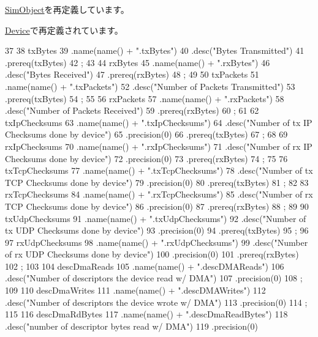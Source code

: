 \hyperlink{classSimObject_a4dc637449366fcdfc4e764cdf12d9b11}{SimObject}を再定義しています。

\hyperlink{classSinic_1_1Device_a4dc637449366fcdfc4e764cdf12d9b11}{Device}で再定義されています。


\begin{DoxyCode}
37 {
38     txBytes
39         .name(name() + ".txBytes")
40         .desc("Bytes Transmitted")
41         .prereq(txBytes)
42         ;
43 
44     rxBytes
45         .name(name() + ".rxBytes")
46         .desc("Bytes Received")
47         .prereq(rxBytes)
48         ;
49 
50     txPackets
51         .name(name() + ".txPackets")
52         .desc("Number of Packets Transmitted")
53         .prereq(txBytes)
54         ;
55 
56     rxPackets
57         .name(name() + ".rxPackets")
58         .desc("Number of Packets Received")
59         .prereq(rxBytes)
60         ;
61 
62     txIpChecksums
63         .name(name() + ".txIpChecksums")
64         .desc("Number of tx IP Checksums done by device")
65         .precision(0)
66         .prereq(txBytes)
67         ;
68 
69     rxIpChecksums
70         .name(name() + ".rxIpChecksums")
71         .desc("Number of rx IP Checksums done by device")
72         .precision(0)
73         .prereq(rxBytes)
74         ;
75 
76     txTcpChecksums
77         .name(name() + ".txTcpChecksums")
78         .desc("Number of tx TCP Checksums done by device")
79         .precision(0)
80         .prereq(txBytes)
81         ;
82 
83     rxTcpChecksums
84         .name(name() + ".rxTcpChecksums")
85         .desc("Number of rx TCP Checksums done by device")
86         .precision(0)
87         .prereq(rxBytes)
88         ;
89 
90     txUdpChecksums
91         .name(name() + ".txUdpChecksums")
92         .desc("Number of tx UDP Checksums done by device")
93         .precision(0)
94         .prereq(txBytes)
95         ;
96 
97     rxUdpChecksums
98         .name(name() + ".rxUdpChecksums")
99         .desc("Number of rx UDP Checksums done by device")
100         .precision(0)
101         .prereq(rxBytes)
102         ;
103 
104     descDmaReads
105         .name(name() + ".descDMAReads")
106         .desc("Number of descriptors the device read w/ DMA")
107         .precision(0)
108         ;
109 
110     descDmaWrites
111         .name(name() + ".descDMAWrites")
112         .desc("Number of descriptors the device wrote w/ DMA")
113         .precision(0)
114         ;
115 
116     descDmaRdBytes
117         .name(name() + ".descDmaReadBytes")
118         .desc("number of descriptor bytes read w/ DMA")
119         .precision(0)
}
\end{DoxyCode}
